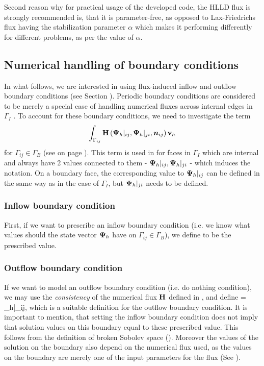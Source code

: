 Second reason why for practical usage of the developed code, the HLLD flux is strongly recommended is, that it is parameter-free, as opposed to Lax-Friedrichs flux having the stabilization parameter $\alpha$ which makes it performing differently for different problems, as per the value of $\alpha$.

\subsection{Numerical handling of boundary conditions}
In what follows, we are interested in using flux-induced inflow and outflow boundary conditions (see Section ). Periodic boundary conditions are considered to be merely a special case of handling numerical fluxes across internal edges in $\Gamma_I$ .
To account for these boundary conditions, we need to investigate the term
$$
\int_{\Gamma_{ij}} \mathrm{\mathbf{H}}\left({\mathrm{\mathbf{\Psi}}_h}|_{ij}, {\mathrm{\mathbf{\Psi}}_h}|_{ji}, \mbox{\boldmath $n$}_{ij}\right) \mathrm{\mathbf{v}}_h
$$
for $\Gamma_{ij} \in \Gamma_B$ (see  on page \pageref{BndEdges}).
This term is used in  for faces in $\Gamma_I$ which are internal and always have 2 values connected to them - $\mathrm{\mathbf{\Psi}}_h|_{ij}, {\mathrm{\mathbf{\Psi}}_h}|_{ji}$ - which induces the notation. On a boundary face, the corresponding value to ${\mathrm{\mathbf{\Psi}}_h}|_{ij}$ can be defined in the same way as in the case of $\Gamma_I$, but ${\mathrm{\mathbf{\Psi}}_h}|_{ji}$ needs to be defined.
\subsubsection{Inflow boundary condition}
First, if we want to prescribe an inflow boundary condition (i.e. we know what values should the state vector $\mathrm{\mathbf{\Psi}}_h$ have on ${\Gamma_{ij}}\in\Gamma_B$), we define
\be
\label{BC1} 
\ee
to be the prescribed value.

\subsubsection{Outflow boundary condition}
If we want to model an outflow boundary condition (i.e. do nothing condition), we may use the \textit{consistency} of the numerical flux $\mathrm{\mathbf{H}}$ defined in , and define
\be
\label{BC2}  = {\mrPsi_h}|_{ij},
\ee
which is a suitable definition for the outflow boundary condition. It is important to mention, that setting the inflow boundary condition does not imply that solution values on this boundary equal to these prescribed value. This follows from the definition of broken Sobolev space (). Moreover the values of the solution on the boundary also depend on the numerical flux used, as the values on the boundary are merely one of the input parameters for the flux (See ).

